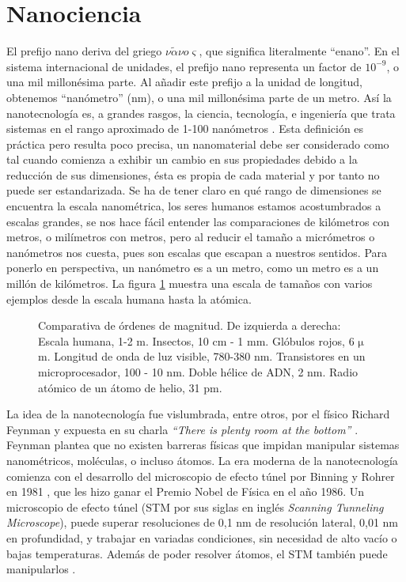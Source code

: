 \section*{Nanociencia}
El prefijo nano deriva del griego $\nu \tilde{\alpha} \nu o \varsigma$, que significa literalmente ``enano''. En el sistema internacional de unidades, el prefijo nano representa un factor de $\mathrm{10^{-9}}$, o una mil millonésima parte. Al añadir este prefijo a la unidad de longitud, obtenemos ``nanómetro'' (nm), o una mil millonésima parte de un metro. Así la nanotecnología es, a grandes rasgos, la ciencia, tecnología, e ingeniería que trata sistemas en el rango aproximado de 1-100 nanómetros \citep{Haick2013,Gressler2013}. Esta definición es práctica pero resulta poco precisa, un nanomaterial debe ser considerado como tal cuando comienza a exhibir un cambio en sus propiedades debido a la reducción de sus dimensiones, ésta es propia de cada material y por tanto no puede ser estandarizada. Se ha de tener claro en qué rango de dimensiones se encuentra la escala nanométrica, los seres humanos estamos acostumbrados a escalas grandes, se nos hace fácil entender las comparaciones de kilómetros con metros, o milímetros con metros, pero al reducir el tamaño a micrómetros o nanómetros nos cuesta, pues son escalas que escapan a nuestros sentidos. Para ponerlo en perspectiva, un nanómetro es a un metro, como un metro es a un millón de kilómetros. La figura \ref{fig:scale} muestra una escala de tamaños con varios ejemplos desde la escala humana hasta la atómica.

\begin{figure}[h!]
	\centering
	\caption[Comparativa de ódenes de magnitud desde metros hasta picometros]{Comparativa de órdenes de magnitud. De izquierda a derecha: Escala humana, 1-2 m. Insectos, 10 cm - 1 mm. Glóbulos rojos, 6 $\mathrm{\mu}$m. Longitud de onda de luz visible, 780-380 nm. Transistores en un microprocesador, 100 - 10 nm. Doble hélice de ADN, 2 nm. Radio atómico de un átomo de helio, 31 pm.}
\label{fig:scale}
\end{figure}

La idea de la nanotecnología fue vislumbrada, entre otros, por el físico Richard Feynman y expuesta en su charla \emph{``There is plenty room at the bottom''} \citep{Feynman1960}. Feynman plantea que no existen barreras físicas que impidan manipular sistemas nanométricos, moléculas, o incluso átomos. La era moderna de la nanotecnología comienza con el desarrollo del microscopio de efecto túnel por Binning y Rohrer en 1981 \citep{Binnig1982}, que les hizo ganar el Premio Nobel de Física en el año 1986. Un microscopio de efecto túnel (STM por sus siglas en inglés \emph{Scanning Tunneling Microscope}), puede superar resoluciones de 0,1 nm de resolución lateral, 0,01 nm en profundidad, y trabajar en variadas condiciones, sin necesidad de alto vacío o bajas temperaturas. Además de poder resolver átomos, el STM también puede manipularlos \citep{Chen2008}.

